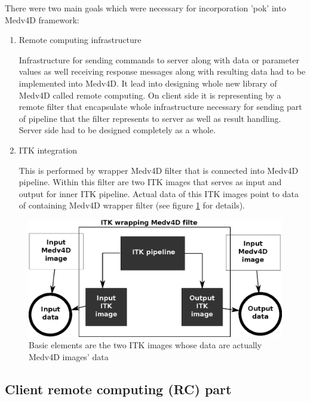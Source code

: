 \par
There were two main goals which were necessary for incorporation 'pok' into
Medv4D framework:
\begin{enumerate}

  \item{Remote computing infrastructure}
  \par
  Infrastructure for sending commands to server along with data or parameter values as well receiving response messages along with resulting data had to be implemented into Medv4D.
It lead into designing whole new library of Medv4D called remote computing.
On client side it is representing by a remote filter that encapsulate whole infrastructure necessary for sending part of pipeline that the filter represents to server as well as result handling.
Server side had to be designed completely as a whole.

  \item{ITK integration}
  \par
  This is performed by wrapper Medv4D filter that is connected into Medv4D pipeline.
Within this filter are two ITK images that serves as input and output for inner ITK pipeline.
Actual data of this ITK images point to data of containing Medv4D wrapper filter (see figure \ref{fg:ITKWrapping} for details).

\end{enumerate}

\begin{figure}
    \centering
    \includegraphics[width=12cm]{data/ITKFilter}
    \caption[ITK wrapper Medv4D filter]{Basic elements are the two ITK images whose data are actually Medv4D images' data}
    \label{fg:ITKWrapping}
\end{figure}

\subsection{Client remote computing (RC) part}

